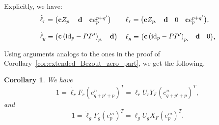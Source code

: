 \documentclass[10pt]{article}
\newtheorem{corollary}{Corollary}
\newcommand\g[1]{\textbf{#1}}
\newcommand\id[1]{\text{id}_{#1}}
\begin{document}
Explicitly, we have:
\[\begin{tabular}{l l}
$\tilde{\ell}_r=\begin{pmatrix}
\g{c}Z_{p.} & \g{d} & \g{c}e^{p+q'}_p
\end{pmatrix}$
&
$\ell_r=\begin{pmatrix}
\g{c}Z_{p.} & \g{d} & 0 & \g{c}e^{p+q'}_p
\end{pmatrix}$,\\
& \\
$\tilde{\ell}_g=\begin{pmatrix}
\g{c}\left(\id{p}-PP'\right)_{p.} & \g{d}
\end{pmatrix}$ &
$\ell_g=\begin{pmatrix}
\g{c}\left(\id{p}-PP'\right)_{p.} & \g{d} & 0
\end{pmatrix}$,
\end{tabular}\]

Using arguments analogs to the ones in the proof of
Corollary~\ref{cor:extended_Bezout_zero_part}, we get the following.
\begin{corollary}\label{cor:extended_Bezout_id_part}
  We have
  \begin{equation}\label{equ:extend_Bezout_id_rel_part}
    1=\tilde{\ell}_rF_r(e^n_{q+p'+p})^T=\ell_rU_rY_F(e^n_{q+p'+p})^T,
  \end{equation}
  and
  \begin{equation}\label{equ:extend_Bezout_id_gen_part}
    1=\tilde{\ell}_gF_g(e^m_p)^T=\ell_gU_gX_F(e^m_p)^T.
  \end{equation}
\end{corollary}
\end{document}
